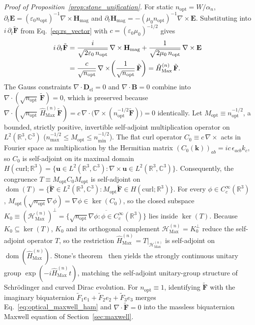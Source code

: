 \documentclass[aps,prd,onecolumn,tightenlines,nofootinbib,notitlepage,11pt,floatfix]{revtex4-2}
\theoremstyle{indentedtheorem}
\begin{document}
\emph{Proof of Proposition~\ref{prop:stone_unification}.}
For static $n_\text{opt}=W/\alpha_n$, $\partial_t\mathbf{E}=(\varepsilon_0 n_\text{opt})^{-1}\nabla\times\mathbf{H}_\text{mag}$ and $\partial_t\mathbf{H}_\text{mag}=-(\mu_0 n_\text{opt})^{-1}\nabla\times\mathbf{E}$. Substituting into $i\,\partial_t\tilde{\mathbf{F}}$ from Eq.~\eqref{eq:rs_vector} with $c=(\varepsilon_0\mu_0)^{-1/2}$ gives
\begin{align}
    i\,\partial_t\tilde{\mathbf{F}}
    &= \frac{i}{\sqrt{2\varepsilon_0\,n_\text{opt}}}\,\nabla\times\mathbf{H}_\text{mag} + \frac{1}{\sqrt{2\mu_0\,n_\text{opt}}}\,\nabla\times\mathbf{E} \notag\\
    &= \frac{c}{\sqrt{n_\text{opt}}}\,\nabla\times\!\left(\frac{1}{\sqrt{n_\text{opt}}}\,\tilde{\mathbf{F}}\right) = \hat{H}_\text{Max}^{(n)}\,\tilde{\mathbf{F}} .
    \label{eq:rs_maxwell_derivation}
\end{align}
The Gauss constraints $\nabla\cdot\mathbf{D}_\text{el}=0$ and $\nabla\cdot\mathbf{B}=0$ combine into $\nabla\cdot(\sqrt{n_\text{opt}}\,\tilde{\mathbf{F}})=0$, which is preserved because $\nabla\cdot(\sqrt{n_\text{opt}}\,\hat{H}_\text{Max}^{(n)}\tilde{\mathbf{F}})=c\,\nabla\cdot\bigl(\nabla\times(n_\text{opt}^{-1/2}\tilde{\mathbf{F}})\bigr)=0$ identically. Let $M_\text{opt}\equiv n_\text{opt}^{-1/2}$, a bounded, strictly positive, invertible self-adjoint multiplication operator on $L^2(\mathbb{R}^3,\mathbb{C}^3)$ ($n_{\max}^{-1/2}\le M_\text{opt}\le n_{\min}^{-1/2}$). The flat curl operator $C_0\equiv c\,\nabla\times$ acts in Fourier space as multiplication by the Hermitian matrix $(C_0(\mathbf{k}))_{ab}=ic\,\epsilon_{acb}k_c$, so $C_0$ is self-adjoint on its maximal domain $H(\mathrm{curl};\mathbb{R}^3)=\{\mathbf{u}\in L^2(\mathbb{R}^3,\mathbb{C}^3):\nabla\times\mathbf{u}\in L^2(\mathbb{R}^3,\mathbb{C}^3)\}$. Consequently, the congruence $T\equiv M_\text{opt}C_0 M_\text{opt}$ is self-adjoint on $\operatorname{dom}(T)=\{\tilde{\mathbf{F}}\in L^2(\mathbb{R}^3,\mathbb{C}^3):M_\text{opt}\tilde{\mathbf{F}}\in H(\mathrm{curl};\mathbb{R}^3)\}$. For every $\phi\in C_c^\infty(\mathbb{R}^3)$, $M_\text{opt}(\sqrt{n_\text{opt}}\nabla\phi)=\nabla\phi\in\ker(C_0)$, so the closed subspace $K_0\equiv(\mathcal{H}_\text{Max}^{(n)})^\perp = \overline{\{\sqrt{n_\text{opt}}\nabla\phi:\phi\in C_c^\infty(\mathbb{R}^3)\}}$ lies inside $\ker(T)$. Because $K_0\subseteq\ker(T)$, $K_0$ and its orthogonal complement $\mathcal{H}_\text{Max}^{(n)}=K_0^\perp$ reduce the self-adjoint operator $T$, so the restriction $\hat{H}_\text{Max}^{(n)}=T|_{\mathcal{H}_\text{Max}^{(n)}}$ is self-adjoint on $\operatorname{dom}(\hat{H}_\text{Max}^{(n)})$. Stone's theorem~\citep{Stone1932} then yields the strongly continuous unitary group $\exp(-i\hat{H}_\text{Max}^{(n)}t)$, matching the self-adjoint unitary-group structure of Schr\"odinger and curved Dirac evolution. For $n_\text{opt}\equiv 1$, identifying $\tilde{\mathbf{F}}$ with the imaginary biquaternion $\tilde{F}_1 e_1+\tilde{F}_2 e_2+\tilde{F}_3 e_3$ merges Eq.~\eqref{eq:optical_maxwell_ham} and $\nabla\cdot\tilde{\mathbf{F}}=0$ into the massless biquaternion Maxwell equation of Section~\ref{sec:maxwell}.
\end{document}
